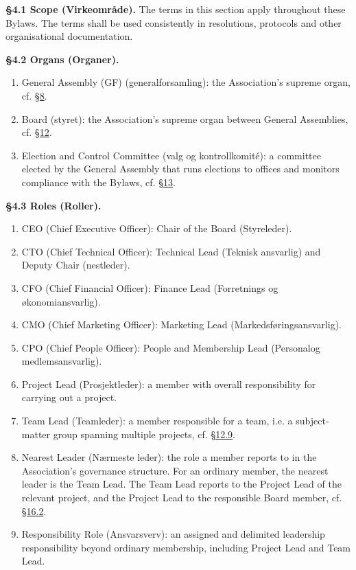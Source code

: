 \documentclass{../../../Common/Latex/Templates/rapport}
\begin{document}
\label{bylaw:4}
\textbf{\S 4.1 Scope (Virkeområde).}\label{bylaw:4.1} The terms in this section apply throughout these Bylaws. The terms shall be used consistently in resolutions, protocols and other organisational documentation.

\textbf{\S 4.2 Organs (Organer).}\label{bylaw:4.2}
\begin{enumerate}
  \item General Assembly (GF) (generalforsamling): the Association's supreme organ, cf. \hyperref[bylaw:8]{\S 8}.
  \item Board (styret): the Association's supreme organ between General Assemblies, cf. \hyperref[bylaw:12]{\S 12}.
  \item Election and Control Committee (valg og kontrollkomité): a committee elected by the General Assembly that runs elections to offices and monitors compliance with the Bylaws, cf. \hyperref[bylaw:13]{\S 13}.
\end{enumerate}

\textbf{\S 4.3 Roles (Roller).}\label{bylaw:4.3}
\begin{enumerate}
  \item CEO (Chief Executive Officer): Chair of the Board (Styreleder).
  \item CTO (Chief Technical Officer): Technical Lead (Teknisk ansvarlig) and Deputy Chair (nestleder).
  \item CFO (Chief Financial Officer): Finance Lead (Forretnings og økonomiansvarlig).
  \item CMO (Chief Marketing Officer): Marketing Lead (Markedsføringsansvarlig).
  \item CPO (Chief People Officer): People and Membership Lead (Personalog medlemsansvarlig).
  \item Project Lead (Prosjektleder): a member with overall responsibility for carrying out a project.
  \item Team Lead (Teamleder): a member responsible for a team, i.e. a subject-matter group spanning multiple projects, cf. \hyperref[bylaw:12.9]{\S 12.9}.
  \item Nearest Leader (Nærmeste leder): the role a member reports to in the Association's governance structure. For an ordinary member, the nearest leader is the Team Lead. The Team Lead reports to the Project Lead of the relevant project, and the Project Lead to the responsible Board member, cf. \hyperref[bylaw:16.2]{\S 16.2}.
  \item Responsibility Role (Ansvarsverv): an assigned and delimited leadership responsibility beyond ordinary membership, including Project Lead and Team Lead.
\end{enumerate}
\end{document}
